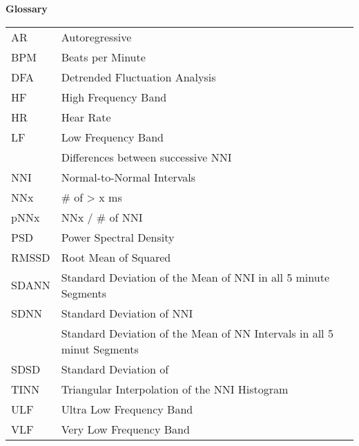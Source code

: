 \textbf{Glossary}
\begin{table}[h!]
    \footnotesize
    \centering
    \begin{tabular}{L{2cm}L{15cm}}
            AR                      &   Autoregressive                                                              \\
            BPM                     &   Beats per Minute                                                            \\
            DFA                     &   Detrended Fluctuation Analysis                                              \\
            HF                      &   High Frequency Band                                                           \\
            HR                      &   Hear Rate                                                                     \\
            LF                      &   Low Frequency Band                                                            \\
                 &   Differences between successive NNI                                            \\
            NNI                     &   Normal-to-Normal Intervals                                                    \\
            NNx                     &   \# of  > x ms                                              \\
            pNNx                    &   NNx / \# of NNI                                                               \\
            PSD                     &   Power Spectral Density                                                      \\
            RMSSD                   &   Root Mean of Squared                                       \\
            SDANN                   &   Standard Deviation of the Mean of NNI in all 5 minute Segments                \\
            SDNN                    &   Standard Deviation of NNI                                                     \\
               &   Standard Deviation of the Mean of NN Intervals in all 5 minut Segments      \\
            SDSD                    &   Standard Deviation of                                      \\
            TINN                    &   Triangular Interpolation of the NNI Histogram                                 \\
            ULF                     &   Ultra Low Frequency Band                                                      \\
            VLF                     &   Very Low Frequency Band
    \end{tabular}
    \label{table:glossary}
\end{table}